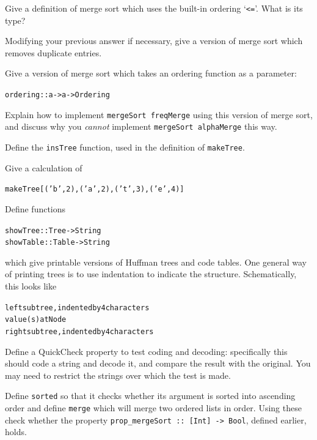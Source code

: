 \begin{exercises}

\item
Give a definition of merge sort which uses the built-in ordering `\texttt{<=}'.
What is its type?

\item
Modifying your previous answer if necessary, give a version of merge sort
which removes duplicate entries.

\item
Give a version of merge sort which takes an ordering function as a parameter:
\begin{alltt}
ordering :: a -> a -> Ordering
\end{alltt}
Explain how to implement \texttt{mergeSort freqMerge} using this version of
merge sort, and discuss why you {\em cannot\/} implement \texttt{mergeSort
alphaMerge} this way.

\item
Define the \texttt{insTree} function, used in the definition of \texttt{makeTree}.

\item
Give a calculation of
\begin{alltt}
makeTree  [('b',2),('a',2),('t',3),('e',4)]
\end{alltt}

\item
Define functions
\begin{alltt}
showTree  :: Tree  -> String
showTable :: Table -> String
\end{alltt}
which give printable versions of Huffman trees and code tables. One general
way of printing trees is to use indentation to indicate the structure.
Schematically, this looks like
\begin{alltt}
    left sub tree,  indented by 4 characters
value(s) at Node
    right sub tree, indented by 4 characters
\end{alltt}



\item
Define a QuickCheck property to test coding and decoding: specifically this should code a string and decode it, and compare the result with the original. You may need to restrict the strings over which the test is made.

\item
Define  \texttt{sorted} so that it checks whether its argument is sorted into ascending order and define \texttt{merge} which will merge two ordered lists in order. Using these check whether the property \texttt{prop\_mergeSort ::\ [Int] -> Bool}, defined earlier, holds.


\end{exercises}
